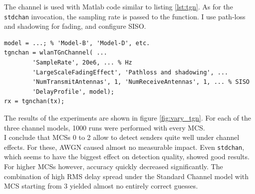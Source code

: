 The channel is used with Matlab code similar to listing \ref{lst:tgn}. As for the \texttt{stdchan} invocation, the sampling rate is passed to the function. I use path-loss and shadowing for fading, and configure \gls{SISO}.

\begin{lstlisting}[captionpos=b,caption={Matlab wlanTGnChannel Simulation},label=lst:tgn]
model = ...; % 'Model-B', 'Model-D', etc.
tgnchan = wlanTGnChannel( ...
        'SampleRate', 20e6, ... % Hz
        'LargeScaleFadingEffect', 'Pathloss and shadowing', ...
        'NumTransmitAntennas', 1, 'NumReceiveAntennas', 1, ... % SISO
        'DelayProfile', model);
rx = tgnchan(tx);
\end{lstlisting}

The results of the experiments are shown in figure \ref{fig:vary_tgn}. For each of the three channel models, 1000 runs were performed with every \gls{MCS}.\\

I conclude that \glspl{MCS} 0 to 2 allow to detect senders quite well under channel effects. For these, \gls{AWGN} caused almost no measurable impact. Even \texttt{stdchan}, which seems to have the biggest effect on detection quality, showed good results. For higher \glspl{MCS} however, accuracy quickly decreased significantly. The combination of high \gls{RMS} delay spread under the Standard Channel model with \gls{MCS} starting from 3 yielded almost no entirely correct guesses.

